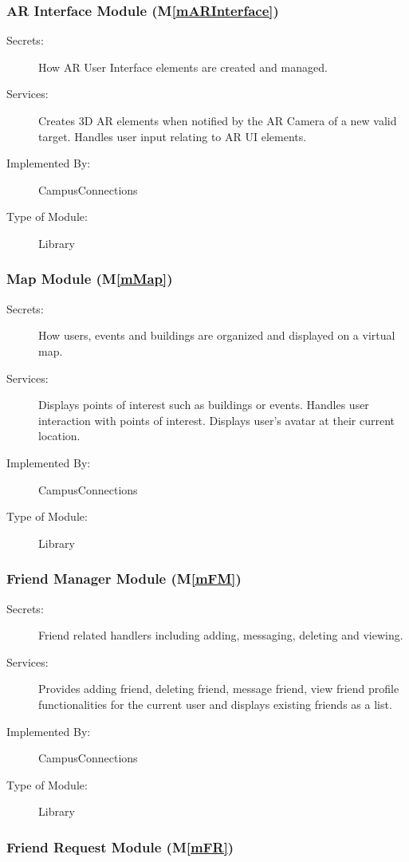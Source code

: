\documentclass[12pt, titlepage]{article}
\newcommand{\mref}[1]{M\ref{#1}}
\begin{document}
\subsubsection{AR Interface Module (\mref{mARInterface})}
\begin{description}
\item[Secrets:]How AR User Interface elements are created and managed.
\item[Services:]Creates 3D AR elements when notified by the AR Camera of a new valid target. Handles user input relating to AR UI elements.
\item[Implemented By:] CampusConnections
\item[Type of Module:] Library
\end{description}

\subsubsection{Map Module (\mref{mMap})}
\begin{description}
\item[Secrets:]How users, events and buildings are organized and displayed on a virtual map.
\item[Services:]Displays points of interest such as buildings or events. Handles user interaction with points of interest. Displays user's avatar at their current location.
\item[Implemented By:] CampusConnections
\item[Type of Module:] Library
\end{description}

\subsubsection{Friend Manager Module (\mref{mFM})}

\begin{description}
\item[Secrets:]Friend related handlers including adding, messaging, deleting and viewing.
\item[Services:]Provides adding friend, deleting friend, message friend, view friend profile functionalities for the current user and displays existing friends as a list.
\item[Implemented By:] CampusConnections
\item[Type of Module:] Library
\end{description}

\subsubsection{Friend Request Module (\mref{mFR})}
\end{document}
